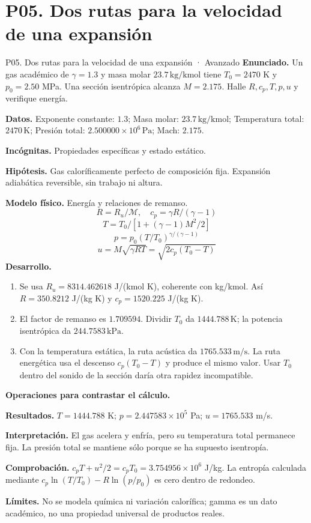 \section{P05. Dos rutas para la velocidad de una expansión}
\begin{studiumworked}{P05. Dos rutas para la velocidad de una expansión · Avanzado}
\textbf{Enunciado.} Un gas académico de $\gamma=1.3$ y masa molar $23.7\,\mathrm{kg/kmol}$ tiene $T_0=2470$ K y $p_0=2.50$ MPa. Una sección isentrópica alcanza $M=2.175$. Halle $R,c_p,T,p,u$ y verifique energía.

\textbf{Datos.} Exponente constante: $1.3$; Masa molar: $23.7\,\mathrm{kg/kmol}$; Temperatura total: $2470\,\mathrm{K}$; Presión total: $2.500000\times10^{6}\,\mathrm{Pa}$; Mach: $2.175$.

\textbf{Incógnitas.} Propiedades específicas y estado estático.

\textbf{Hipótesis.} Gas caloríficamente perfecto de composición fija. Expansión adiabática reversible, sin trabajo ni altura.

\textbf{Modelo físico.} Energía y relaciones de remanso.
\[R=R_u/\mathcal M,\quad c_p=\gamma R/(\gamma-1)\]
\[T=T_0/[1+(\gamma-1)M^2/2]\]
\[p=p_0(T/T_0)^{\gamma/(\gamma-1)}\]
\[u=M\sqrt{\gamma RT}=\sqrt{2c_p(T_0-T)}\]
\textbf{Desarrollo.}
\begin{enumerate}
\item Se usa $R_u=8314.462618$ J/(kmol K), coherente con kg/kmol. Así $R=350.8212$ J/(kg K) y $c_p=1520.225$ J/(kg K).
\item El factor de remanso es $1.709594$. Dividir $T_0$ da $1444.788\,\mathrm{K}$; la potencia isentrópica da $244.7583\,\mathrm{kPa}$.
\item Con la temperatura estática, la ruta acústica da $1765.533\,\mathrm{m/s}$. La ruta energética usa el descenso $c_p(T_0-T)$ y produce el mismo valor. Usar $T_0$ dentro del sonido de la sección daría otra rapidez incompatible.
\end{enumerate}
\textbf{Operaciones para contrastar el cálculo.}

\textbf{Resultados.} $T=1444.788$ K; $p=2.447583\times10^{5}$ Pa; $u=1765.533$ m/s.

\textbf{Interpretación.} El gas acelera y enfría, pero su temperatura total permanece fija. La presión total se mantiene sólo porque se ha supuesto isentropía.

\textbf{Comprobación.} $c_pT+u^2/2=c_pT_0=3.754956\times10^{6}$ J/kg. La entropía calculada mediante $c_p\ln(T/T_0)-R\ln(p/p_0)$ es cero dentro de redondeo.

\textbf{Límites.} No se modela química ni variación calorífica; gamma es un dato académico, no una propiedad universal de productos reales.
\end{studiumworked}
